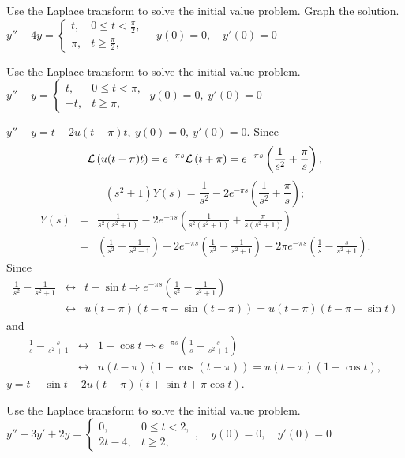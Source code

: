 \documentclass{ximera}
\begin{document}
\begin{problem}\label{exer:8.5.9} Use the Laplace transform to solve the initial value problem.  Graph the solution. 
$y''+4y= \left\{\begin{array}{cl} t,&0\le
t<\frac{\pi}{2},\\ \pi,&t\ge\frac{\pi}{2},
\end{array}\right.\quad y(0)=0,\quad y'(0)=0$
\end{problem}

\begin{problem}\label{exer:8.5.10}
Use the Laplace transform to solve the initial value problem.
$y''+y=\left\{\begin{array}{cl}t,&0\le t<\pi,
\\ -t,&t\ge\pi ,\end{array}\right.\;  y(0)=0,\;  y'(0)=0$

\begin{solution}
$y''+y=t-2u(t-\pi)t,\ y(0)=0,\ y'(0)=0$.
Since
$$
{\cal L}\left(u(t-\pi)t\right)=e^{-\pi s}{\cal L}\left(t+\pi\right)
=e^{-\pi s}\left(\frac{1}{s^2}+\frac{\pi}{s}\right),
$$
$$
(s^2+1)Y(s)=\frac{1}{s^2}-2e^{-\pi s}\left(\frac{1}{s^2}+\frac{\pi}{s}\right);
$$
\begin{eqnarray*}
Y(s)&=& \frac{1}{s^2(s^2+1)}-2e^{-\pi s}\left(\frac{1}{s^2(s^2+1)}+\frac{\pi}{s(s^2+1)}\right)\\ &=&\left(\frac{1}{s^2}-\frac{1}{s^2+1}\right)-2e^{-\pi s} \left(\frac{1}{s^2}-\frac{1}{s^2+1}\right)-2\pi e^{-\pi s}\left(\frac{1}{s}-\frac{s}{s^2+1}\right).
\end{eqnarray*}
Since
\begin{eqnarray*}
\frac{1}{s^2}-\frac{1}{s^2+1}&\leftrightarrow& t-\sin t\Rightarrow
e^{-\pi s}\left(\frac{1}{s^2}-\frac{1}{s^2+1}\right)\\ &\leftrightarrow&
u(t-\pi)\left(t-\pi-\sin(t-\pi)\right)=u(t-\pi)(t-\pi+\sin t)
\end{eqnarray*}
and
\begin{eqnarray*}
\frac{1}{s}-\frac{s}{s^2+1}&\leftrightarrow& 1-\cos t\Rightarrow
e^{-\pi s}\left(\frac{1}{s}-\frac{s}{s^2+1}\right)\\ &\leftrightarrow&
u(t-\pi)\left(1-\cos(t-\pi)\right)=u(t-\pi)(1+\cos t),
\end{eqnarray*}
 $y=t-\sin t-2u(t-\pi)(t+\sin t+\pi\cos t)$.
\end{solution}
\end{problem}

\begin{problem}\label{exer:8.5.11} Use the Laplace transform to solve the initial value problem.
$y''-3y'+2y=\left\{\begin{array}{cl} 0,&0\le
t<2,\\2t-4,&t\ge 2,\end{array}\right. ,\quad y(0)=0,\quad y'(0)=0$
\end{problem}
\end{document}
